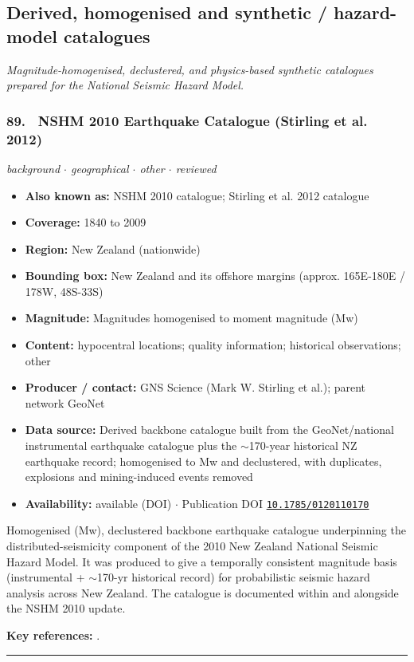 \documentclass[10pt,a4paper]{article}
\newcommand{\catentryrule}{\par\vspace{3pt}\noindent\textcolor{rulegrey}{\rule{\linewidth}{0.3pt}}\par\vspace{5pt}}
\newcommand{\kv}[2]{\item \textbf{#1:} #2}
\begin{document}
\subsection{Derived, homogenised and synthetic / hazard-model catalogues}
\textit{Magnitude-homogenised, declustered, and physics-based synthetic catalogues prepared for the National Seismic Hazard Model.}\par\vspace{4pt}
\subsubsection*{\hypertarget{c:89}{89.}~ NSHM 2010 Earthquake Catalogue (Stirling et al. 2012)}
{\small\itshape background $\cdot$ geographical $\cdot$ other $\cdot$ reviewed}\par\vspace{2pt}
\begin{itemize}[leftmargin=1.3em,itemsep=0.6pt,topsep=1pt,parsep=0pt]
\kv{Also known as}{NSHM 2010 catalogue; Stirling et al. 2012 catalogue}
\kv{Coverage}{1840 to 2009}
\kv{Region}{New Zealand (nationwide)}
\kv{Bounding box}{New Zealand and its offshore margins (approx. 165E-180E / 178W, 48S-33S)}
\kv{Magnitude}{Magnitudes homogenised to moment magnitude (Mw)}
\kv{Content}{hypocentral locations; quality information; historical observations; other}
\kv{Producer / contact}{GNS Science (Mark W. Stirling et al.); parent network GeoNet}
\kv{Data source}{Derived backbone catalogue built from the GeoNet/national instrumental earthquake catalogue plus the $\sim$170-year historical NZ earthquake record; homogenised to Mw and declustered, with duplicates, explosions and mining-induced events removed}
\kv{Availability}{available (DOI) $\cdot$ Publication DOI \href{https://doi.org/10.1785/0120110170}{\nolinkurl{10.1785/0120110170}}}
\end{itemize}
\par\vspace{2pt}Homogenised (Mw), declustered backbone earthquake catalogue underpinning the distributed-seismicity component of the 2010 New Zealand National Seismic Hazard Model. It was produced to give a temporally consistent magnitude basis (instrumental + $\sim$170-yr historical record) for probabilistic seismic hazard analysis across New Zealand. The catalogue is documented within and alongside the NSHM 2010 update.
\par\vspace{2pt}\textbf{Key references:} \cite{Stirling2012}.
\catentryrule
\end{document}
